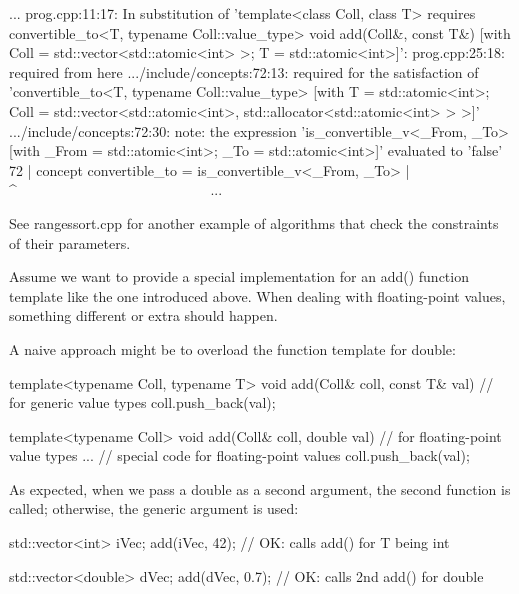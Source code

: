 {\footnotesize
\begin{shell}
...
prog.cpp:11:17: In substitution of ’template<class Coll, class T>
                 requires convertible_to<T, typename Coll::value_type>
                 void add(Coll&, const T&)
                [with Coll = std::vector<std::atomic<int> >; T = std::atomic<int>]’:
prog.cpp:25:18: required from here
.../include/concepts:72:13: required for the satisfaction of
                 ’convertible_to<T, typename Coll::value_type>
                  [with T = std::atomic<int>;
                      Coll = std::vector<std::atomic<int>,
                                              std::allocator<std::atomic<int> > >]’
.../include/concepts:72:30: note: the expression ’is_convertible_v<_From, _To>
                      [with _From = std::atomic<int>; _To = std::atomic<int>]’
                      evaluated to ’false’
    72 | concept convertible_to = is_convertible_v<_From, _To>
        |                                    ^~~~~~~~~~~~~~~~~~~~~~~~~~~~
...
\end{shell}
}

See rangessort.cpp for another example of algorithms that check the constraints of their parameters.


Assume we want to provide a special implementation for an add() function template like the one introduced above. When dealing with floating-point values, something different or extra should happen.

A naive approach might be to overload the function template for double:

\begin{cpp}
template<typename Coll, typename T>
void add(Coll& coll, const T& val) // for generic value types
{
	coll.push_back(val);
}

template<typename Coll>
void add(Coll& coll, double val) // for floating-point value types
{
	... // special code for floating-point values
	coll.push_back(val);
}
\end{cpp}

As expected, when we pass a double as a second argument, the second function is called; otherwise, the generic argument is used:

\begin{cpp}
std::vector<int> iVec;
add(iVec, 42); // OK: calls add() for T being int

std::vector<double> dVec;
add(dVec, 0.7); // OK: calls 2nd add() for double
\end{cpp}

